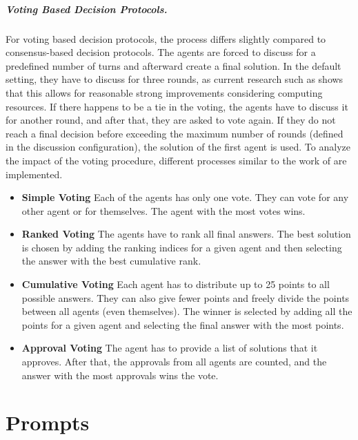 \subparagraph{Voting Based Decision Protocols.}
For voting based decision protocols, the process differs slightly compared to consensus-based decision protocols. The agents are forced to discuss for a predefined number of turns and afterward create a final solution. In the default setting, they have to discuss for three rounds, as current research such as \citet{du_improving_2023} shows that this allows for reasonable strong improvements considering computing resources. If there happens to be a tie in the voting, the agents have to discuss it for another round, and after that, they are asked to vote again. If they do not reach a final decision before exceeding the maximum number of rounds (defined in the discussion configuration), the solution of the first agent is used. To analyze the impact of the voting procedure, different processes similar to the work of \citet{yang_llm_2024} are implemented.
\begin{itemize}
    \item \textbf{Simple Voting} Each of the agents has only one vote. They can vote for any other agent or for themselves. The agent with the most votes wins.
    \item \textbf{Ranked Voting} The agents have to rank all final answers. The best solution is chosen by adding the ranking indices for a given agent and then selecting the answer with the best cumulative rank.
    \item \textbf{Cumulative Voting} Each agent has to distribute up to 25 points to all possible answers. They can also give fewer points and freely divide the points between all agents (even themselves). The winner is selected by adding all the points for a given agent and selecting the final answer with the most points.
    \item \textbf{Approval Voting} The agent has to provide a list of solutions that it approves. After that, the approvals from all agents are counted, and the answer with the most approvals wins the vote.
\end{itemize}
\clearpage




\section{Prompts}
\label{sec:app_prompts}
